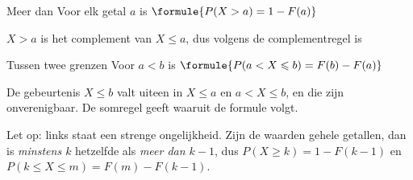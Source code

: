 \begin{theorie}
\begin{stelling}{Meer dan}
Voor elk getal $a$ is \quad $\formule{P(X > a) = 1 - F(a)}$
\end{stelling}

\begin{bewijs}
\textit{$X > a$} is het complement van \textit{$X \leqslant a$}, dus volgens de complementregel is
\end{bewijs}

\begin{stelling}{Tussen twee grenzen}
Voor $a < b$ is \quad $\formule{P(a < X \leqslant b) = F(b) - F(a)}$
\end{stelling}

\begin{bewijs}
De gebeurtenis \textit{$X \leqslant b$} valt uiteen in \textit{$X \leqslant a$} en \textit{$a < X \leqslant b$}, en die zijn onverenigbaar. De somregel geeft
waaruit de formule volgt.
\end{bewijs}
\end{theorie}

Let op: links staat een strenge ongelijkheid. Zijn de waarden gehele getallen, dan is \textit{minstens $k$} hetzelfde als \textit{meer dan $k - 1$}, dus $P(X \geqslant k) = 1 - F(k - 1)$ en $P(k \leqslant X \leqslant m) = F(m) - F(k - 1)$.


\begin{oefeningen}
\end{oefeningen}

